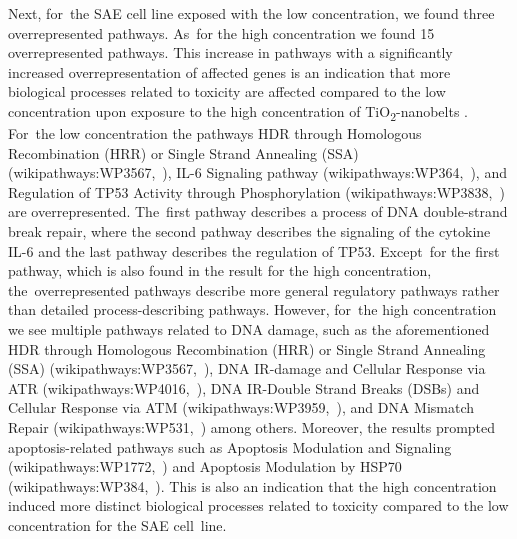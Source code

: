\documentclass[ijms,article,accept,moreauthors,pdftex]{Definitions/mdpi}
\begin{document}
\begin{paracol}{2}
Next, for~the SAE cell line exposed with the low concentration, we found three overrepresented pathways. As~for the high concentration we found 15 overrepresented pathways. This increase in pathways with a significantly increased overrepresentation of affected genes is an indication that more biological processes related to toxicity are affected compared to the low concentration upon exposure to the high concentration of TiO\textsubscript{2}-nanobelts . For~the low concentration the pathways HDR through Homologous Recombination (HRR) or Single Strand Annealing (SSA) (wikipathways:WP3567,~\cite{WP3567}), IL-6 Signaling pathway (wikipathways:WP364,~\cite{WP364}), and Regulation of TP53 Activity through Phosphorylation (wikipathways:WP3838,~\cite{WP3838}) are overrepresented. The~first pathway describes a process of DNA double-strand break repair, where the second pathway describes the signaling of the cytokine IL-6 and the last pathway describes the regulation of TP53. Except~for the first pathway, which is also found in the result for the high concentration, the~overrepresented pathways describe more general regulatory pathways rather than detailed process-describing pathways. However, for~the high concentration we see multiple pathways related to DNA damage, such as the aforementioned HDR through Homologous Recombination (HRR) or Single Strand Annealing (SSA) (wikipathways:WP3567,~\cite{WP3567}), DNA IR-damage and Cellular Response via ATR (wikipathways:WP4016,~\cite{WP4016}), DNA IR-Double Strand Breaks (DSBs) and Cellular Response via ATM (wikipathways:WP3959,~\cite{WP3959}), and DNA Mismatch Repair (wikipathways:WP531,~\cite{WP531}) among others. Moreover, the results prompted apoptosis-related pathways such as Apoptosis Modulation and Signaling (wikipathways:WP1772,~\cite{WP1772}) and Apoptosis Modulation by HSP70 (wikipathways:WP384,~\cite{WP384}). This is also an indication that the high concentration induced more distinct biological processes related to toxicity compared to the low concentration for the SAE cell~line. 


\end{paracol}
\end{document}
